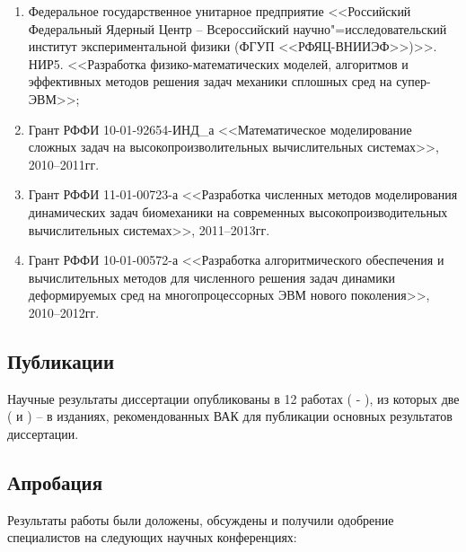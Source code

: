 \begin{enumerate}

\item Федеральное государственное унитарное предприятие <<Российский Федеральный Ядерный Центр -- Всероссийский научно"=исследовательский институт экспериментальной физики (ФГУП <<РФЯЦ-ВНИИЭФ>>)>>. НИР5. <<Разработка физико-математических моделей, алгоритмов и эффективных методов решения задач механики сплошных сред на супер-ЭВМ>>;

\item Грант РФФИ 10-01-92654-ИНД\_а <<Математическое моделирование сложных задач на высокопроизволительных вычислительных системах>>, 2010--2011гг.

\item Грант РФФИ 11-01-00723-а <<Разработка численных методов моделирования динамических задач биомеханики на современных высокопроизводительных вычислительных системах>>, 2011--2013гг.

\item Грант РФФИ 10-01-00572-а <<Разработка алгоритмического обеспечения и вычислительных методов для численного решения задач динамики деформируемых сред на многопроцессорных ЭВМ нового поколения>>, 2010--2012гг.

\end{enumerate}

\subsection*{Публикации}

Научные результаты диссертации опубликованы в 12 работах (\cite{agapov_vasyukov_petrov} - \cite{a12}), из которых две (\cite{a8} и \cite{a9}) -- в изданиях, рекомендованных ВАК для публикации основных результатов диссертации.

\subsection*{Апробация}

Результаты работы были доложены, обсуждены и получили одобрение специалистов на следующих научных конференциях:

